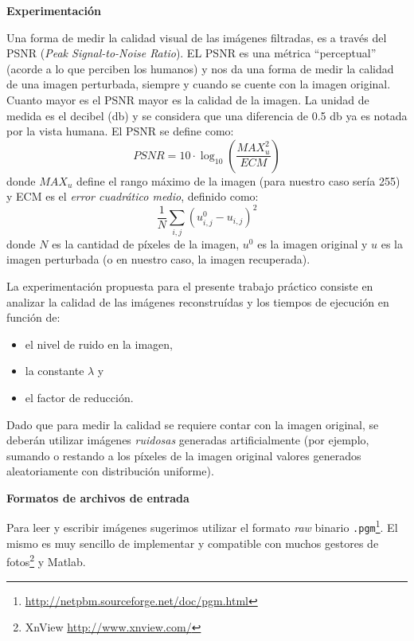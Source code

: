 \documentclass[a4paper]{article}
\begin{document}
{\bf Experimentaci\'on}

Una forma de medir la calidad visual de las im\'agenes filtradas, es a trav\'es del PSNR ({\em Peak Signal-to-Noise Ratio}).
EL PSNR es una m\'etrica ``perceptual'' (acorde a lo que perciben los humanos) y nos da una forma de medir la calidad de una imagen perturbada, siempre y cuando se cuente con la imagen original. 
Cuanto mayor es el PSNR mayor es la calidad de la imagen. La unidad de medida es el decibel (db) y se considera que una diferencia de 0.5 db ya es notada por la vista humana. El PSNR se define como:
$$
\mathit{PSNR} = 10 \cdot \log_{10} \left( \frac{\mathit{MAX}^2_u}{\mathit{ECM}} \right)
$$
donde $MAX_u$ define el rango m\'aximo de la imagen (para nuestro caso ser\'ia 255) y ECM es el {\em error cuadr\'atico medio}, definido como:
$$
\frac{1}{N} \sum_{i,j}{(u^0_{i,j} - u_{i,j})^2} 
$$
donde $N$ es la cantidad de p\'ixeles de la imagen, $u^0$ es la imagen original y $u$ es la imagen perturbada (o en nuestro caso, la imagen recuperada).

La experimentaci\'on propuesta para el presente trabajo pr\'actico consiste en analizar la calidad de las im\'agenes reconstru\'idas y los tiempos de ejecuci\'on en funci\'on de: \\[-8mm]
	\begin{itemize}
		\item el nivel de ruido en la imagen, \\[-6mm]
		\item la constante $\lambda$ y\\[-6mm]
		\item el factor de reducci\'on. \\[-6mm]
	\end{itemize}	
	
Dado que para medir la calidad se requiere contar con la imagen original, se deber\'an utilizar im\'agenes \emph{ruidosas} generadas artificialmente (por ejemplo, sumando o restando a los p\'ixeles de la imagen original valores generados aleatoriamente con distribuci\'on uniforme).
	
{\bf Formatos de archivos de entrada}

Para leer y escribir im\'agenes sugerimos utilizar el formato {\em raw} binario \texttt{.pgm}\footnote{\url{http://netpbm.sourceforge.net/doc/pgm.html}}. 
El mismo es muy sencillo de implementar y compatible con muchos gestores de fotos\footnote{XnView \url{http://www.xnview.com/}} y Matlab.
\end{document}
